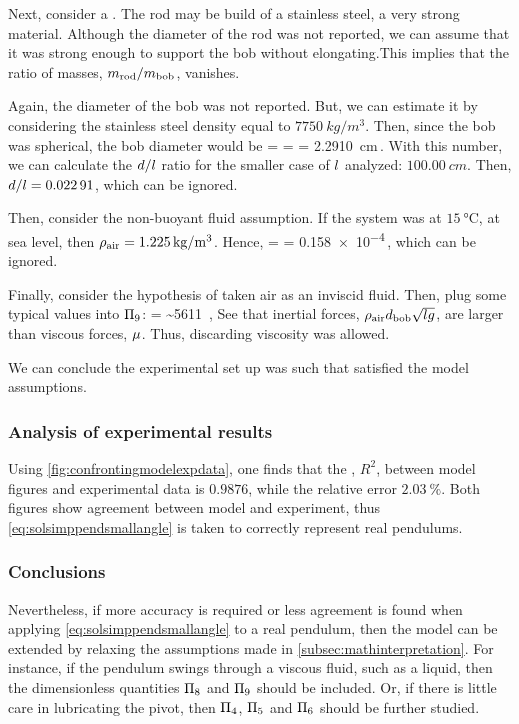 Next, consider a . The rod may be build of a stainless steel, a very strong material. Although the diameter of the rod was not reported, we can assume that it was strong enough to support the bob without elongating.This implies that the ratio of masses, $m_\text{rod}/m_\text{bob}$, vanishes.

Again, the diameter of the bob was not reported. But, we can estimate it by considering the stainless steel density equal to $\SI{7750}{kg/m^3}$. Then, since the bob was spherical, the bob diameter would be
\beq
\diam = 
      = 
      = \SI{2.2910}{cm}\,.
\eeq
With this number, we can calculate the $d/l$ ratio for the smaller case of $l$ analyzed: $\SI{100.00}{cm}$. Then, $d/l = \num{0.02291}$, which can be ignored.

Then, consider the non-buoyant fluid assumption. If the system was at $\SI{15}{\celsius}$, at sea level, then $\rho_\text{air} = \SI{1.225}{kg/m^3}$. Hence, 
\beq
{} =  
                                         = \num{0.158e-4}\,, 
\eeq
which can be ignored.

Finally, consider the hypothesis of taken air as an inviscid fluid. Then, plug some typical values into $\Pi_9$:
\beq
{}
    = 
    \sim \num{5611} \,,
\eeq
See that inertial forces, $\rho_\text{air}d_\text{bob}\sqrt{lg}$, are larger than viscous forces, $\mu$. Thus, discarding viscosity was allowed.

We can conclude the experimental set up was such that satisfied the model assumptions.

\subsubsection{Analysis of experimental results}
Using \cref{fig:confrontingmodelexpdata}, one finds that the , $R^2$, between model figures and experimental data is $\num{0.9876}$, while the relative error $\SI{2.03}{\%}$. Both figures show agreement between model and experiment, thus \cref{eq:solsimppendsmallangle} is taken to correctly represent real pendulums.


\subsubsection{Conclusions}
Nevertheless, if more accuracy is required or less agreement is found when applying \cref{eq:solsimppendsmallangle} to a real pendulum, then the model can be extended by relaxing the assumptions made in \cref{subsec:mathinterpretation}. For instance, if the pendulum swings through a viscous fluid, such as a liquid, then the dimensionless quantities $\Pi_8$ and $\Pi_9$ should be included. Or, if there is little care in lubricating the pivot, then $\Pi_4$, $\Pi_5$ and $\Pi_6$ should be further studied.
